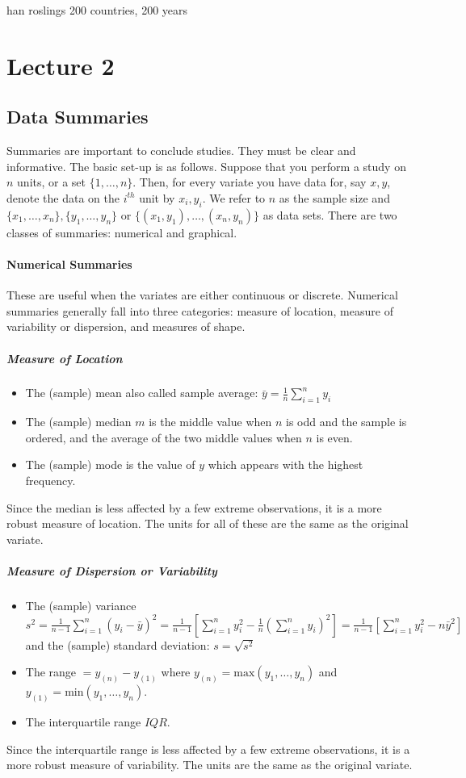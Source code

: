 \documentclass[10pt,letter]{article}
\theoremstyle{plain}
\theoremstyle{definition}
\begin{document}
han roslings 200 countries, 200 years



\section*{Lecture 2}
\subsection{Data Summaries}
Summaries are important to conclude studies. They must be clear and informative. The basic set-up is as follows. Suppose that you perform a study on $n$ units, or a set $\{1,\ldots,n\}$. Then, for every variate you have data for, say $x,y$, denote the data on the $i^{th}$ unit by $x_i,y_i$. We refer to $n$ as the sample size and $\{x_1,\ldots,x_n\},\{y_1,\ldots,y_n\}$ or $\{(x_1,y_1),\ldots,(x_n,y_n)\}$ as data sets. There are two classes of summaries: numerical and graphical.
\paragraph{Numerical Summaries}
These are useful when the variates are either continuous or discrete. Numerical summaries generally fall into three categories: measure of location, measure of variability or dispersion, and measures of shape.
\subparagraph{Measure of Location}
\begin{itemize}
    \item The (sample) mean also called sample average: $\bar{y}=\frac{1}{n}\sum_{i=1}^ny_i$ 
    \item The (sample) median $m$ is the middle value when $n$ is odd and the sample is ordered, and the average of the two middle values when $n$ is even. 
    \item The (sample) mode is the value of $y$ which appears with the highest frequency.
\end{itemize}
Since the median is less affected by a few extreme observations, it is a more robust measure of location. The units for all of these are the same as the original variate. 
\subparagraph{Measure of Dispersion or Variability}
\begin{itemize}
    \item The (sample) variance $s^2=\frac{1}{n-1}\sum_{i=1}^n(y_i-\bar{y})^2=\frac{1}{n-1}\left[\sum_{i=1}^ny_i^2-\frac{1}{n}\left(\sum_{i=1}^ny_i\right)^2\right]=\frac{1}{n-1}\left[\sum_{i=1}^ny_i^2-n\bar{y}^2\right]$ and the (sample) standard deviation: $s=\sqrt{s^2}$
    \item The range $=y_{(n)}-y_{(1)}$ where $y_{(n)}=\text{max}(y_1,\ldots,y_n)$ and $y_{(1)}=\text{min}(y_1,\ldots,y_n)$. 
    \item The interquartile range $IQR$.
\end{itemize}
Since the interquartile range is less affected by a few extreme observations, it is a more robust measure of variability. The units are the same as the original variate.
\end{document}
